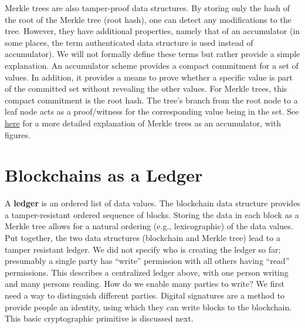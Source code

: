 \documentclass{article}
\begin{document}
Merkle trees are also tamper-proof data structures. By storing only the hash of the root of the Merkle tree (root hash), one can detect any modifications to the tree. However, they have additional properties, namely that of an accumulator (in some places, the term authenticated data structure is used instead of accumulator). We will not formally define these terms but rather provide a simple explanation. An accumulator scheme provides a compact commitment for a set of values. In addition, it provides a means to prove whether a specific value is part of the committed set without revealing the other values. For Merkle trees, this compact commitment is the root hash. The tree’s branch from the root node to a leaf node acts as a proof/witness for the corresponding value being in the set. See \href{https://nakamoto.com/merkle-trees/}{here} for a more detailed explanation of Merkle trees as an accumulator, with figures.

\section*{Blockchains as a Ledger}
A \textbf{ledger} is an ordered list of data values. The blockchain data structure provides a tamper-resistant ordered sequence of blocks. Storing the data in each block as a Merkle tree allows for a natural ordering (e.g., lexicographic) of the data values. Put together, the two data structures (blockchain and Merkle tree) lead to a tamper resistant ledger. We did not specify who is creating the ledger so far; presumably a single party has “write” permission with all others having “read” permissions. This describes a centralized ledger above, with one person writing and many persons reading. How do we enable many parties to write? We first need a way to distinguish different parties.  Digital signatures are a method to provide people an identity, using which they can write blocks to the blockchain. This basic cryptographic primitive is discussed next.

\end{document}
